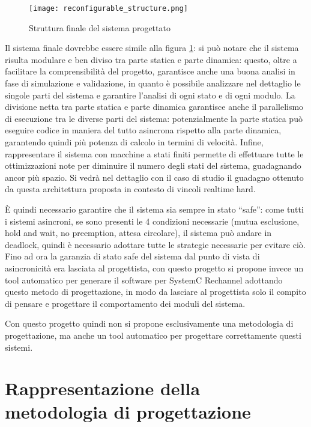 \documentclass[a4paper,titlepage]{book}
\begin{document}
\begin{figure}[!ht]
\centering
\texttt{[image: reconfigurable\_structure.png]}
\caption{Struttura finale del sistema progettato}\label{fig:6}
\end{figure}

Il sistema finale dovrebbe essere simile alla figura \ref{fig:6}: si può notare che il sistema risulta modulare e ben diviso tra parte statica e parte dinamica: questo, oltre a facilitare la comprensibilità del progetto, garantisce anche una buona analisi in fase di simulazione e validazione, in quanto è possibile analizzare nel dettaglio le singole parti del sistema e garantire l'analisi di ogni stato e di ogni modulo.
La divisione netta tra parte statica e parte dinamica garantisce anche il parallelismo di esecuzione tra le diverse parti del sistema: potenzialmente la parte statica può eseguire codice in maniera del tutto asincrona rispetto alla parte dinamica, garantendo quindi più potenza di calcolo in termini di velocità. Infine, rappresentare il sistema con macchine a stati finiti permette di effettuare tutte le ottimizzazioni note per diminuire il numero degli stati del sistema, guadagnando ancor più spazio.
Si vedrà nel dettaglio con il caso di studio il guadagno ottenuto da questa architettura proposta in contesto di vincoli realtime hard.

È quindi necessario garantire che il sistema sia sempre in stato ``safe'': come tutti i sistemi asincroni, se sono presenti le 4 condizioni necessarie (mutua esclusione, hold and wait, no preemption, attesa circolare), il sistema può andare in deadlock, quindi è necessario adottare tutte le strategie necessarie per evitare ciò.
Fino ad ora la garanzia di stato safe del sistema dal punto di vista di asincronicità era lasciata al progettista, con questo progetto si propone invece un tool automatico per generare il software per SystemC Rechannel adottando questo metodo di progettazione, in modo da lasciare al progettista solo il compito di pensare e progettare il comportamento dei moduli del sistema.

Con questo progetto quindi non si propone esclusivamente una metodologia di progettazione, ma anche un tool automatico per progettare correttamente questi sistemi.


\section{Rappresentazione della metodologia di progettazione}
\end{document}
